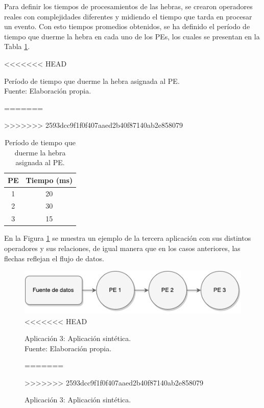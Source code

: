 
Para definir los tiempos de procesamientos de las hebras, se crearon operadores reales con complejidades diferentes y midiendo el tiempo que tarda en procesar un evento. Con esto tiempos promedios obtenidos, se ha definido el per\'iodo de tiempo que duerme la hebra en cada uno de los PEs, los cuales se presentan en la Tabla \ref{tab:app3-time}.


\begin{table}[!ht]
\centering
<<<<<<< HEAD
\captionsetup{justification=centering}
\caption[Período de tiempo que duerme la hebra asignada al PE.]{Período de tiempo que duerme la hebra asignada al PE.\\Fuente: Elaboración propia.}
=======
\caption{Per\'iodo de tiempo que duerme la hebra asignada al PE.}
>>>>>>> 2593dcc9f1f0f407aaed2b40f87140ab2e858079
\begin{tabular}{| c | c |}
\hline
PE & Tiempo (ms) \\ \hline
1 & 20 \\
2 & 30 \\
3 & 15 \\\hline
\end{tabular}
\label{tab:app3-time}
\end{table}

En la Figura \ref{fig:terceraAplicacion} se muestra un ejemplo de la tercera aplicaci\'on con sus distintos operadores y sus relaciones, de igual manera que en los casos anteriores, las flechas reflejan el flujo de datos.

\begin{figure}[!ht]
	\centering
	\captionsetup{justification=centering}
		\includegraphics[scale=0.6]{images/App3.pdf}
<<<<<<< HEAD
	\caption[Aplicación 3: Aplicación sintética.]{Aplicación 3: Aplicación sintética.\\Fuente: Elaboración propia.}
=======
	\caption{Aplicaci\'on 3: Aplicaci\'on sint\'etica.}
>>>>>>> 2593dcc9f1f0f407aaed2b40f87140ab2e858079
	\label{fig:terceraAplicacion}
\end{figure}

